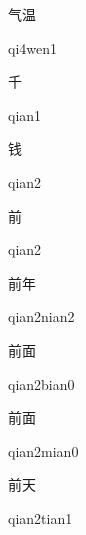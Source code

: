 \begin{verbete}[qi4wen1]{气温}
\begin{pronuncia}{qi4wen1}
\end{pronuncia}
\end{verbete}

\begin{verbete}[qian1]{千}
\begin{pronuncia}{qian1}
\end{pronuncia}
\end{verbete}

\begin{verbete}[qian2]{钱}
\begin{pronuncia}{qian2}
\end{pronuncia}
\end{verbete}

\begin{verbete}[qian2]{前}
\begin{pronuncia}{qian2}
\end{pronuncia}
\end{verbete}

\begin{verbete}{前年}
\begin{pronuncia}{qian2nian2}
\end{pronuncia}
\end{verbete}

\begin{verbete}{前面}
\begin{pronuncia}{qian2bian0}
\end{pronuncia}
\end{verbete}

\begin{verbete}{前面}
\begin{pronuncia}{qian2mian0}
\end{pronuncia}
\end{verbete}

\begin{verbete}{前天}
\begin{pronuncia}{qian2tian1}
\end{pronuncia}
\end{verbete}

